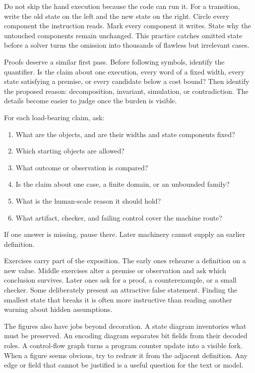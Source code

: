 Do not skip the hand execution because the code can run it. For a transition,
write the old state on the left and the new state on the right. Circle every
component the instruction reads. Mark every component it writes. State why
the untouched components remain unchanged. This practice catches omitted
state before a solver turns the omission into thousands of flawless but
irrelevant cases.

Proofs deserve a similar first pass. Before following symbols, identify the
quantifier. Is the claim about one execution, every word of a fixed width,
every state satisfying a premise, or every candidate below a cost bound? Then
identify the proposed reason: decomposition, invariant, simulation, or
contradiction. The details become easier to judge once the burden is visible.

\begin{proofkit}[title={\iconProofKit\ A six-question reading routine}]
For each load-bearing claim, ask:
\begin{enumerate}
\item What are the objects, and are their widths and state components fixed?
\item Which starting objects are allowed?
\item What outcome or observation is compared?
\item Is the claim about one case, a finite domain, or an unbounded family?
\item What is the human-scale reason it should hold?
\item What artifact, checker, and failing control cover the machine route?
\end{enumerate}
If one answer is missing, pause there. Later machinery cannot supply an
earlier definition.
\end{proofkit}

Exercises carry part of the exposition. The early ones rehearse a definition
on a new value. Middle exercises alter a premise or observation and ask which
conclusion survives. Later ones ask for a proof, a counterexample, or a small
checker. Some deliberately present an attractive false statement. Finding the
smallest state that breaks it is often more instructive than reading another
warning about hidden assumptions.

The figures also have jobs beyond decoration. A state diagram inventories
what must be preserved. An encoding diagram separates bit fields from their
decoded roles. A control-flow graph turns a program counter update into a
visible fork. When a figure seems obvious, try to redraw it from the adjacent
definition. Any edge or field that cannot be justified is a useful question
for the text or model.

